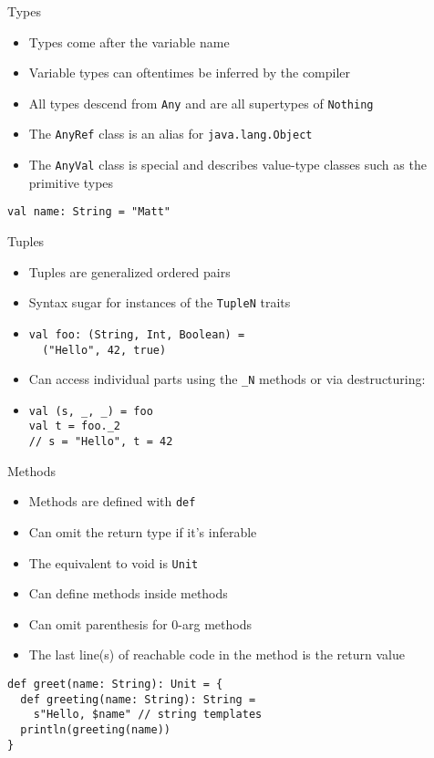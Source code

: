 \documentclass{beamer}
\begin{document}
\begin{frame}[fragile]{Types}
\begin{itemize}
\item Types come after the variable name
\item Variable types can oftentimes be inferred by the compiler
\item All types descend from \lstinline{Any} and are all supertypes of \lstinline{Nothing}
\item The \lstinline{AnyRef} class is an alias for \lstinline{java.lang.Object}
\item The \lstinline{AnyVal} class is special and describes value-type classes such as the primitive types
\end{itemize}
\begin{lstlisting}
val name: String = "Matt"
\end{lstlisting}
\end{frame}

\begin{frame}[fragile]{Tuples}
\begin{itemize}
\item Tuples are generalized ordered pairs
\item Syntax sugar for instances of the \lstinline{TupleN} traits
\item
\begin{lstlisting}
val foo: (String, Int, Boolean) =
  ("Hello", 42, true)
\end{lstlisting}
\item Can access individual parts using the \lstinline{_N} methods or via destructuring:
\item
\begin{lstlisting}
val (s, _, _) = foo
val t = foo._2
// s = "Hello", t = 42
\end{lstlisting}
\end{itemize}
\end{frame}

\begin{frame}[fragile]{Methods}
\begin{itemize}
\item Methods are defined with \lstinline{def}
\item Can omit the return type if it's inferable
\item The equivalent to void is \lstinline{Unit}
\item Can define methods inside methods
\item Can omit parenthesis for 0-arg methods
\item The last line(s) of reachable code in the method is the return value
\end{itemize}
\begin{lstlisting}
def greet(name: String): Unit = {
  def greeting(name: String): String =
    s"Hello, $name" // string templates
  println(greeting(name))
}
\end{lstlisting}
\end{frame}
\end{document}

